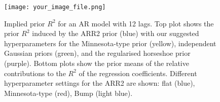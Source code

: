 \documentclass[10pt]{article}
\begin{document}
\begin{figure}[ht]
    \centering
    \texttt{[image: your\_image\_file.png]} %
    \caption{Implied prior $R^2$ for an AR model with 12 lags. Top plot shows the prior $R^2$ induced by the \textcolor{arr2flatcolour}{ARR2 prior (blue)} with our suggested hyperparameters for the \textcolor{minnesotacolour}{Minnesota-type prior (yellow)}, \textcolor{gaussiancolour}{independent Gaussian priors (green)}, and the \textcolor{rhscolour}{regularised horseshoe prior (purple)}. Bottom plots show the prior means of the relative contributions to the $R^2$ of the regression coefficients. Different hyperparameter settings for the ARR2 are shown: \textcolor{arr2flatcolour}{flat (blue)}, \textcolor{arr2minncolour}{Minnesota-type (red)}, \textcolor{arr2bumpcolour}{Bump (light blue)}.}
    \label{fig:ar_model_priors}
\end{figure}
\end{document}
